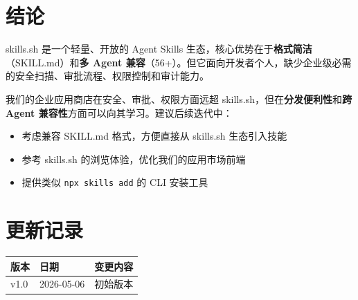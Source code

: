 \documentclass[11pt,a4paper]{article}
\begin{document}
\section{结论}

skills.sh 是一个轻量、开放的 Agent Skills 生态，核心优势在于\textbf{格式简洁}（SKILL.md）和\textbf{多 Agent 兼容}（56+）。但它面向开发者个人，缺少企业级必需的安全扫描、审批流程、权限控制和审计能力。

我们的企业应用商店在安全、审批、权限方面远超 skills.sh，但在\textbf{分发便利性}和\textbf{跨 Agent 兼容性}方面可以向其学习。建议后续迭代中：

\begin{itemize}[nosep]
  \item 考虑兼容 SKILL.md 格式，方便直接从 skills.sh 生态引入技能
  \item 参考 skills.sh 的浏览体验，优化我们的应用市场前端
  \item 提供类似 \texttt{npx skills add} 的 CLI 安装工具
\end{itemize}

\section*{更新记录}

\begin{tabular}{lll}
\toprule
版本 & 日期 & 变更内容 \\
\midrule
v1.0 & 2026-05-06 & 初始版本 \\
\bottomrule
\end{tabular}
\end{document}
